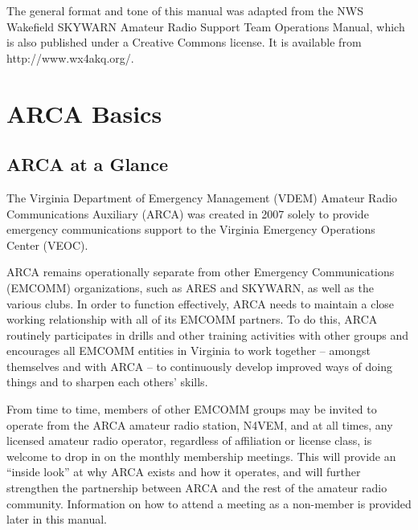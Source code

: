 \documentclass[pdflatex,letterpaper,twoside,12pt]{book}
\begin{document}
The general format and tone of this manual was adapted from the NWS Wakefield SKYWARN Amateur Radio Support Team Operations Manual, which is also published under a Creative Commons license.  It is available from http://www.wx4akq.org/.


\chapter{ARCA Basics}

\section{ARCA at a Glance}

The Virginia Department of Emergency Management (VDEM) Amateur Radio Communications Auxiliary (ARCA) was created in 2007 solely to provide emergency communications support to the Virginia Emergency Operations Center (VEOC).

ARCA remains operationally separate from other Emergency Communications (EMCOMM) organizations, such as ARES and SKYWARN, as well as the various clubs.  In order to function effectively, ARCA needs to maintain a close working relationship with all of its EMCOMM partners.  To do this, ARCA routinely participates in drills and other training activities with other groups and encourages all EMCOMM entities in Virginia to work together – amongst themselves and with ARCA – to continuously develop improved ways of doing things and to sharpen each others' skills.

From time to time, members of other EMCOMM groups may be invited to operate from the ARCA amateur radio station, N4VEM, and at all times, any licensed amateur radio operator, regardless of affiliation or license class, is welcome to drop in on the monthly membership meetings.  This will provide an ``inside look'' at why ARCA exists and how it operates, and will further strengthen the partnership between ARCA and the rest of the amateur radio community.  Information on how to attend a meeting as a non-member is provided later in this manual.
\end{document}
